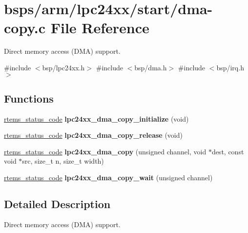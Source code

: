 \hypertarget{lpc24xx_2start_2dma-copy_8c}{}\section{bsps/arm/lpc24xx/start/dma-\/copy.c File Reference}
\label{lpc24xx_2start_2dma-copy_8c}


Direct memory access (D\+MA) support.  


{\ttfamily \#include $<$bsp/lpc24xx.\+h$>$}\newline
{\ttfamily \#include $<$bsp/dma.\+h$>$}\newline
{\ttfamily \#include $<$bsp/irq.\+h$>$}\newline
\subsection*{Functions}
\begin{DoxyCompactItemize}
\item 
\mbox{\hyperlink{group__ClassicStatus_ga545d41846817eaba6143d52ee4d9e9fe}{rtems\+\_\+status\+\_\+code}} {\bfseries lpc24xx\+\_\+dma\+\_\+copy\+\_\+initialize} (void)
\item 
\mbox{\hyperlink{group__ClassicStatus_ga545d41846817eaba6143d52ee4d9e9fe}{rtems\+\_\+status\+\_\+code}} {\bfseries lpc24xx\+\_\+dma\+\_\+copy\+\_\+release} (void)
\item 
\mbox{\hyperlink{group__ClassicStatus_ga545d41846817eaba6143d52ee4d9e9fe}{rtems\+\_\+status\+\_\+code}} {\bfseries lpc24xx\+\_\+dma\+\_\+copy} (unsigned channel, void $\ast$dest, const void $\ast$src, size\+\_\+t n, size\+\_\+t width)
\item 
\mbox{\hyperlink{group__ClassicStatus_ga545d41846817eaba6143d52ee4d9e9fe}{rtems\+\_\+status\+\_\+code}} {\bfseries lpc24xx\+\_\+dma\+\_\+copy\+\_\+wait} (unsigned channel)
\end{DoxyCompactItemize}


\subsection{Detailed Description}
Direct memory access (D\+MA) support. 

